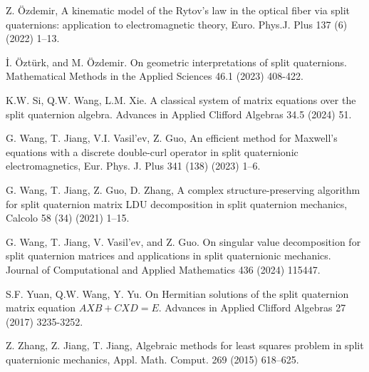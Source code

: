 \documentclass[3p]{elsarticle}
\numberwithin{equation}{section}
\begin{document}
\begin{thebibliography}{99}
 Z. Özdemir, A kinematic model of the Rytov’s law in the optical fiber via split quaternions: application to electromagnetic theory, Euro. Phys.J. Plus 137 (6) (2022) 1–13.

 İ. Öztürk, and M. Özdemir. On geometric interpretations of split quaternions. Mathematical Methods in the Applied Sciences 46.1 (2023) 408-422.

 K.W. Si, Q.W. Wang, L.M. Xie. A classical system of matrix equations over the split quaternion algebra. Advances in Applied Clifford Algebras 34.5 (2024) 51.

 G. Wang, T. Jiang, V.I. Vasil’ev, Z. Guo, An efficient method for Maxwell’s equations with a discrete double-curl operator in split quaternionic electromagnetics, Eur. Phys. J. Plus 341 (138) (2023) 1–6.

G. Wang, T. Jiang, Z. Guo, D. Zhang, A complex structure-preserving algorithm for split quaternion matrix LDU decomposition in split quaternion mechanics, Calcolo 58 (34) (2021) 1–15.

G. Wang, T. Jiang, V. Vasil’ev, and Z. Guo. On singular value decomposition for split quaternion matrices and applications in split quaternionic mechanics. Journal of Computational and Applied Mathematics 436 (2024) 115447.

S.F. Yuan, Q.W. Wang, Y. Yu. On Hermitian solutions of the split quaternion matrix equation $AXB+CXD=E$. Advances in Applied Clifford Algebras 27 (2017) 3235-3252.

Z. Zhang, Z. Jiang, T. Jiang, Algebraic methods for least squares problem in split quaternionic mechanics, Appl. Math. Comput. 269 (2015) 618–625.


\end{thebibliography}
\end{document}
